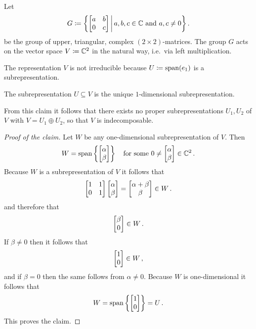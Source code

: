 \begin{example}
  \label{example: upper triangular action on C2}
  Let
  \[
              G
    \coloneqq  \left\{
                \begin{bmatrix}
                  a & b \\
                  0 & c
                \end{bmatrix}
              \,\middle|\,
                a, b, c \in \mathbb{C}
                \text{ and }
                a, c \neq 0
              \right\} .
  \]
  be the group of upper, triangular, complex $(2 \times 2)$-matrices.
  The group $G$ acts on the vector space $V \coloneqq \mathbb{C}^2$ in the natural way, i.e.\ via left multiplication.
  
  The representation $V$ is not irreducible because $U \coloneqq \operatorname{span}(e_1)$ is a subrepresentation.
  \begin{claim}
    The subrepresentation $U \subseteq V$ is the unique $1$-dimensional subrepresentation.
  \end{claim}
  From this claim it follows that there exists no proper subrepresentations $U_1, U_2$ of $V$ with $V = U_1 \oplus U_2$, so that $V$ is indecomposable.
  \begin{proof}[Proof of the claim]
    Let $W$ be any one-dimensional subrepresentation of $V$.
    Then
    \[
        W
      = \operatorname{span}\left\{
                \begin{bmatrix}\alpha \\ \beta\end{bmatrix}
              \right\}
      \quad
      \text{for some $0 \neq  \begin{bmatrix}\alpha \\ \beta\end{bmatrix} \in   \mathbb{C}^2$} \,.
    \]
    Because $W$ is a subrepresentation of $V$ it follows that
    \[
          \begin{bmatrix}
            1 & 1 \\
            0 & 1
          \end{bmatrix}
          \begin{bmatrix}\alpha \\ \beta\end{bmatrix}
      =   \begin{bmatrix}\alpha + \beta \\ \beta\end{bmatrix}
      \in W \,.
    \]
    and therefore that
    \[
      \begin{bmatrix}\beta \\ 0\end{bmatrix} \in W \,.
    \]
    If $\beta \neq 0$ then it follows that
    \[
      \begin{bmatrix}1 \\ 0\end{bmatrix} \in W \,,
    \]
    and if $\beta = 0$ then the same follows from $\alpha \neq 0$.
    Because $W$ is one-dimensional it follows that
    \[
        W
      = \operatorname{span} \left\{ \begin{bmatrix}1 \\ 0\end{bmatrix} \right\}
      = U \,.
    \]
    This proves the claim.
  \end{proof}
\end{example}


